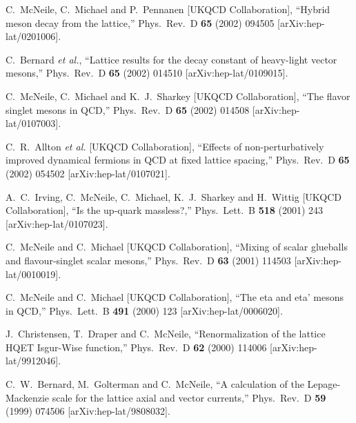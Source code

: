 \begin{thebibliography}{130}
C.~McNeile, C.~Michael and P.~Pennanen  [UKQCD Collaboration],
``Hybrid meson decay from the lattice,''
Phys.\ Rev.\ D {\bf 65} (2002) 094505
[arXiv:hep-lat/0201006].


C.~Bernard {\it et al.},
``Lattice results for the decay constant of heavy-light vector
mesons,''
Phys.\ Rev.\ D {\bf 65} (2002) 014510
[arXiv:hep-lat/0109015].


C.~McNeile, C.~Michael and K.~J.~Sharkey  [UKQCD Collaboration],
``The flavor singlet mesons in QCD,''
Phys.\ Rev.\ D {\bf 65} (2002) 014508
[arXiv:hep-lat/0107003].


C.~R.~Allton {\it et al.}  [UKQCD Collaboration],
``Effects of non-perturbatively improved dynamical fermions in QCD at
 fixed lattice spacing,''
Phys.\ Rev.\ D {\bf 65} (2002) 054502
[arXiv:hep-lat/0107021].


A.~C.~Irving, C.~McNeile, C.~Michael, K.~J.~Sharkey and H.~Wittig  [UKQCD
                  Collaboration],
``Is the up-quark massless?,''
Phys.\ Lett.\ B {\bf 518} (2001) 243
[arXiv:hep-lat/0107023].



C.~McNeile and C.~Michael  [UKQCD Collaboration],
``Mixing of scalar glueballs and flavour-singlet scalar mesons,''
Phys.\ Rev.\ D {\bf 63} (2001) 114503
[arXiv:hep-lat/0010019].


C.~McNeile and C.~Michael  [UKQCD Collaboration],
``The eta and eta' mesons in QCD,''
Phys.\ Lett.\ B {\bf 491} (2000) 123
[arXiv:hep-lat/0006020].


J.~Christensen, T.~Draper and C.~McNeile,
``Renormalization of the lattice HQET Isgur-Wise function,''
Phys.\ Rev.\ D {\bf 62} (2000) 114006
[arXiv:hep-lat/9912046].

C.~W.~Bernard, M.~Golterman and C.~McNeile,
``A calculation of the Lepage-Mackenzie scale for the lattice axial and  vector currents,''
Phys.\ Rev.\ D {\bf 59} (1999) 074506
[arXiv:hep-lat/9808032].


\end{thebibliography}
